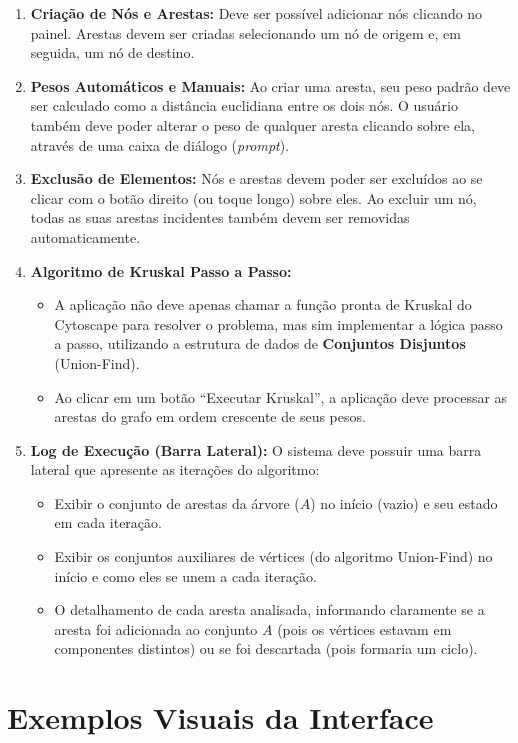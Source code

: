\documentclass[12pt,a4paper]{article}
\begin{document}
\begin{enumerate}
    \item \textbf{Criação de Nós e Arestas:} Deve ser possível adicionar nós clicando no painel. Arestas devem ser criadas selecionando um nó de origem e, em seguida, um nó de destino.
    \item \textbf{Pesos Automáticos e Manuais:} Ao criar uma aresta, seu peso padrão deve ser calculado como a distância euclidiana entre os dois nós. O usuário também deve poder alterar o peso de qualquer aresta clicando sobre ela, através de uma caixa de diálogo (\textit{prompt}).
    \item \textbf{Exclusão de Elementos:} Nós e arestas devem poder ser excluídos ao se clicar com o botão direito (ou toque longo) sobre eles. Ao excluir um nó, todas as suas arestas incidentes também devem ser removidas automaticamente.
    \item \textbf{Algoritmo de Kruskal Passo a Passo:} 
    \begin{itemize}
        \item A aplicação não deve apenas chamar a função pronta de Kruskal do Cytoscape para resolver o problema, mas sim implementar a lógica passo a passo, utilizando a estrutura de dados de \textbf{Conjuntos Disjuntos} (Union-Find).
        \item Ao clicar em um botão ``Executar Kruskal'', a aplicação deve processar as arestas do grafo em ordem crescente de seus pesos.
    \end{itemize}
    \item \textbf{Log de Execução (Barra Lateral):} O sistema deve possuir uma barra lateral que apresente as iterações do algoritmo:
    \begin{itemize}
        \item Exibir o conjunto de arestas da árvore ($A$) no início (vazio) e seu estado em cada iteração.
        \item Exibir os conjuntos auxiliares de vértices (do algoritmo Union-Find) no início e como eles se unem a cada iteração.
        \item O detalhamento de cada aresta analisada, informando claramente se a aresta foi adicionada ao conjunto $A$ (pois os vértices estavam em componentes distintos) ou se foi descartada (pois formaria um ciclo).
    \end{itemize}
\end{enumerate}

\section*{Exemplos Visuais da Interface}
\end{document}
